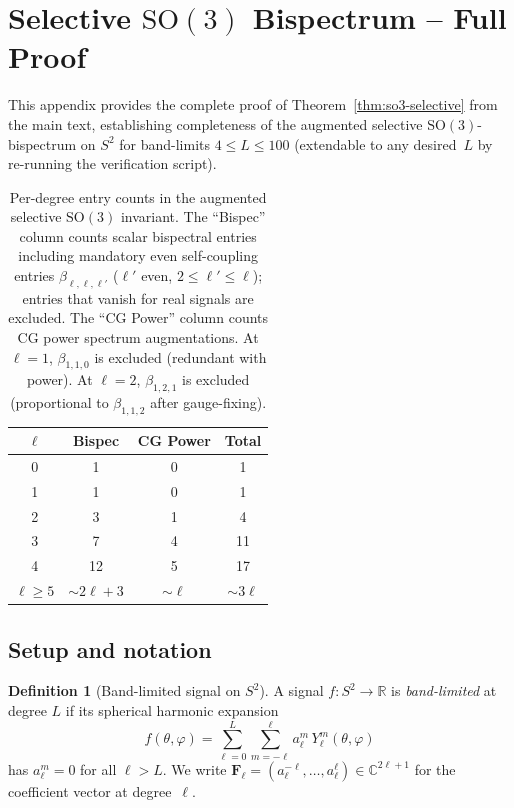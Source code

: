 \documentclass{article}
\theoremstyle{definition}
\newtheorem{definition}[theorem]{Definition}
\theoremstyle{remark}
\newcommand{\R}{\mathbb{R}}
\newcommand{\C}{\mathbb{C}}
\newcommand{\SO}{\mathrm{SO}}
\newcommand{\SH}{Y}
\theoremstyle{definition}
\begin{document}
\appendix

\section{Selective $\SO(3)$ Bispectrum -- Full Proof}
\label{app:so3-proof}

This appendix provides the complete proof of Theorem~\ref{thm:so3-selective}
from the main text, establishing completeness of the augmented selective
$\SO(3)$-bispectrum on $S^2$ for band-limits $4 \le L \le 100$
(extendable to any desired~$L$ by re-running the verification script).

\begin{table}[h]
  \caption{Per-degree entry counts in the augmented selective $\SO(3)$
    invariant. The ``Bispec'' column counts scalar bispectral
    entries including mandatory even self-coupling entries
    $\beta_{\ell,\ell,\ell'}$ ($\ell'$ even, $2 \le \ell' \le \ell$);
    entries that vanish for real signals are excluded.
    The ``CG Power'' column counts CG power spectrum augmentations.
    At $\ell=1$, $\beta_{1,1,0}$ is excluded (redundant with power).
    At $\ell=2$, $\beta_{1,2,1}$ is excluded (proportional to
    $\beta_{1,1,2}$ after gauge-fixing).}
  \label{tab:entry-counts}
  \centering
  \small
  \begin{tabular}{cccc}
    \toprule
    $\ell$ & Bispec & CG Power & Total \\
    \midrule
    0 & 1 & 0 & 1 \\
    1 & 1 & 0 & 1 \\
    2 & 3 & 1 & 4 \\
    3 & 7 & 4 & 11 \\
    4 & 12 & 5 & 17 \\
    $\ell \ge 5$ & $\sim 2\ell{+}3$ & $\sim \ell$ & $\sim 3\ell$ \\
    \bottomrule
  \end{tabular}
\end{table}

\subsection{Setup and notation}

\begin{definition}[Band-limited signal on $S^2$]
A signal $f : S^2 \to \R$ is \emph{band-limited} at degree $L$ if its
spherical harmonic expansion
\begin{equation}\label{eq:app-sh-expansion}
  f(\theta, \varphi)
  = \sum_{\ell=0}^{L} \sum_{m=-\ell}^{\ell}
    a_\ell^m \, \SH_\ell^m(\theta, \varphi)
\end{equation}
has $a_\ell^m = 0$ for all $\ell > L$. We write
$\mathbf{F}_\ell = (a_\ell^{-\ell}, \dotsc, a_\ell^{\ell})
  \in \C^{2\ell+1}$
for the coefficient vector at degree~$\ell$.
\end{definition}
\end{document}

